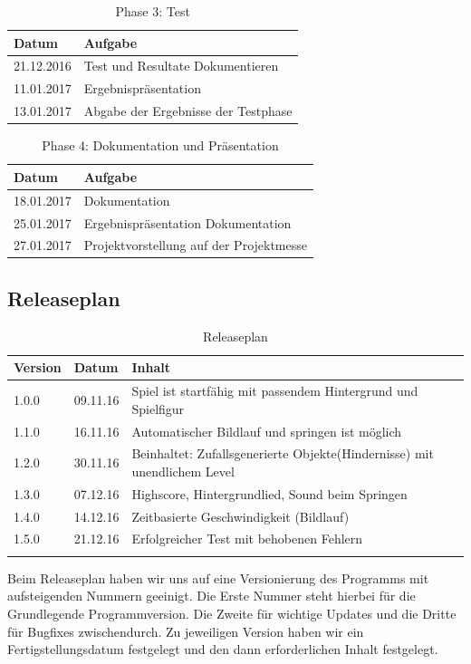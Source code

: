 \begin{table}[h]
	\begin{tabular}{l|l}
		\toprule
		\textbf{Datum}& \textbf{Aufgabe}\\
		\midrule
		21.12.2016 & Test und Resultate Dokumentieren 	\\ 
		11.01.2017 & Ergebnispräsentation	\\
		13.01.2017 & Abgabe der Ergebnisse der Testphase	\\ 
		\bottomrule
	\end{tabular}
	\caption{Phase 3: Test}
\end{table}
\begin{table}[h]
	\begin{tabular}{l|l}
		\toprule
		\textbf{Datum}& \textbf{Aufgabe}\\
		\midrule
		18.01.2017 & Dokumentation 	\\ 
		25.01.2017 & Ergebnispräsentation Dokumentation	\\
		27.01.2017 & Projektvorstellung auf der Projektmesse	\\ 
		\bottomrule
	\end{tabular}
	\caption{Phase 4: Dokumentation und Präsentation}
\end{table}
\newpage
\subsection{Releaseplan}
\begin{longtable}{l|l|p{10cm}}
	\toprule
	\textbf{Version} & \textbf{Datum} & \textbf{Inhalt}\\
	\midrule
	1.0.0 & 09.11.16 & Spiel ist startfähig mit passendem Hintergrund und Spielfigur\\ 
	1.1.0 & 16.11.16 & Automatischer Bildlauf und springen ist möglich\\
	1.2.0 & 30.11.16 & Beinhaltet: Zufallsgenerierte Objekte(Hindernisse) mit unendlichem Level\\ 
	1.3.0 & 07.12.16 & Highscore, Hintergrundlied, Sound beim Springen\\
	1.4.0 & 14.12.16 & Zeitbasierte Geschwindigkeit (Bildlauf)\\
	1.5.0 & 21.12.16 & Erfolgreicher Test mit behobenen Fehlern\\
	\bottomrule
 	\caption{Releaseplan}
\end{longtable}
Beim Releaseplan haben wir uns auf eine Versionierung des Programms mit aufsteigenden Nummern geeinigt. Die Erste Nummer steht hierbei für die Grundlegende Programmversion. Die Zweite für wichtige Updates und die Dritte für Bugfixes zwischendurch. Zu jeweiligen Version haben wir ein Fertigstellungsdatum festgelegt und den dann erforderlichen Inhalt festgelegt.
\newpage
